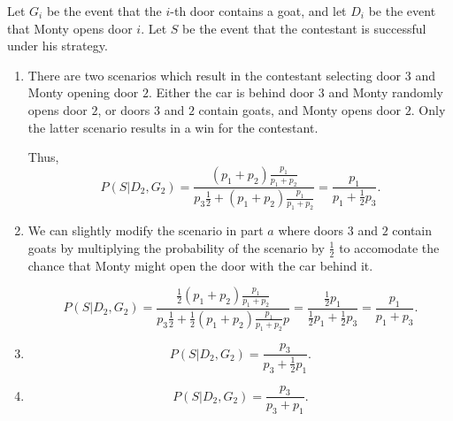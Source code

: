 Let $G_{i}$ be the event that the $i$-th door contains a goat, and let
$D_{i}$ be the event that Monty opens door $i$. Let $S$ be the event that the
contestant is successful under his strategy.

\begin{enumerate}[label=(\alph*)]
\item There are two scenarios which result in the contestant selecting door $3$
and Monty opening door $2$. Either the car is behind door $3$ and Monty randomly
opens door $2$, or doors $3$ and $2$ contain goats, and Monty opens door $2$.
Only the latter scenario results in a win for the contestant.

Thus, $$P(S|D_{2}, G_{2}) = \frac{(p_{1} + p_{2})\frac{p_{1}}{p_{1} + p_{2}}}{p_
{3}\frac{1}{2} + (p_{1} + p_{2})\frac{p_{1}}{p_{1} + p_{2}}} = \frac{p_{1}}{p_
{1} + \frac{1}{2}p_{3}}.$$

\item We can slightly modify the scenario in part $a$ where doors $3$ and $2$
contain goats by multiplying the probability of the scenario by $\frac{1}{2}$ to
accomodate the chance that Monty might open the door with the car behind it.

$$P(S|D_{2}, G_{2}) = \frac{\frac{1}{2}(p_{1} + p_{2})\frac{p_{1}}{p_{1} + p_{2}}}
{p_{3}\frac{1}{2} + \frac{1}{2}(p_{1} + p_{2})\frac{p_{1}}{p_{1} + p_{2}}p} = 
\frac{\frac{1}{2}p_{1}}{\frac{1}{2}p_{1} + \frac{1}{2}p_{3}} = \frac{p_{1}}
{p_{1} + p_{3}}.$$

\item
$$P(S|D_{2}, G_{2}) = \frac{p_{3}}{p_{3} + \frac{1}{2}p_{1}}.$$

\item
$$P(S|D_{2}, G_{2}) = \frac{p_{3}}{p_{3} + p_{1}}.$$
\end{enumerate}
